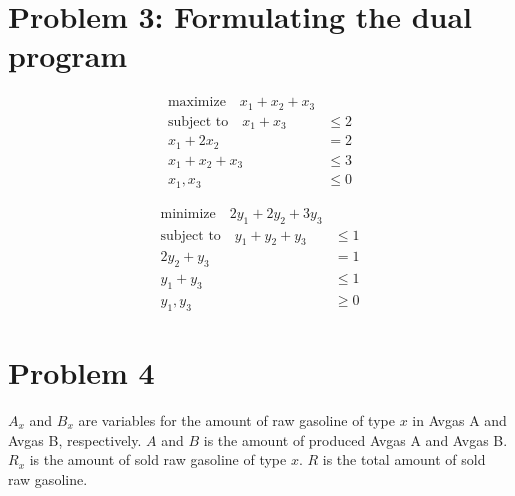 \documentclass[12pt]{article}
\begin{document}
\newpage
\section*{Problem 3: Formulating the dual program}
\begin{minipage}[t]{0.5\textwidth}
\begin{align*}
\text{maximize} \quad x_1 + x_2 + x_3 & \\
\text{subject to} \quad  x_1 + x_3 &\leq 2 \\
x_1 + 2 x_2 &= 2 \\
x_1 + x_2 + x_3 &\leq 3 \\
x_1, x_3 &\leq 0
\end{align*}
\end{minipage}
\begin{minipage}[t]{0.5\textwidth}
\begin{align*}
\text{minimize} \quad 2y_1 + 2y_2 + 3y_3 & \\
\text{subject to} \quad  y_1 + y_2 + y_3 &\leq 1 \\
2y_2 + y_3 &= 1 \\
y_1 + y_3 &\leq 1 \\
y_1, y_3 &\geq 0
\end{align*}
\end{minipage}

\newpage
\section*{Problem 4}
$A_x$ and $B_x$ are variables for the amount of raw gasoline of type $x$ in Avgas A and Avgas B, respectively. $A$ and $B$ is the amount of produced Avgas A and Avgas B. $R_x$ is the amount of sold raw gasoline of type $x$. $R$ is the total amount of sold raw gasoline.
\end{document}
